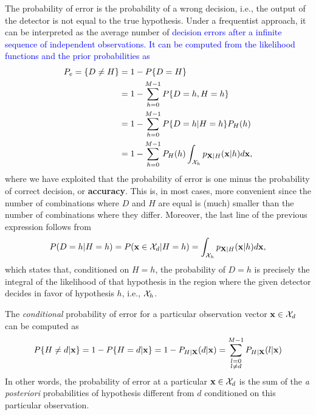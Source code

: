 The probability of error is the probability of a wrong decision, i.e., the output of the detector is not equal to the true hypothesis. Under a frequentist approach, it can be interpreted as the average number of \textcolor{blue}{decision errors after a infinite sequence of independent observations. It can be computed from the likelihood functions and the prior probabilities as}
\begin{align}
    P_e = \{D\neq H\} & = 1 - P\{D=H\} \nonumber \\
    & = 1 - \sum_{h=0}^{M-1} P\{D=h, H=h\} \nonumber \\
    & = 1 - \sum_{h=0}^{M-1} P\{D=h| H=h\} P_H(h) \nonumber \\
    & = 1 - \sum_{h=0}^{M-1} P_H(h) \int_{{\cal X}_h} p_{{\bf X}|H}({\bf x}|h) d{\bf x},\nonumber
\end{align}
where we have exploited that the probability of error is one minus the probability of correct decision, or \textbf{accuracy}. This is, in most cases, more convenient since the number of combinations where $D$ and $H$ are equal is (much) smaller than the number of combinations where they differ. Moreover, the last line of the previous expression follows from
$$P(D=h| H=h) = P({\bf x}\in {\cal X}_d| H=h) = \int_{{\cal X}_h} p_{{\bf X}|H}({\bf x}|h) d{\bf x},$$
which states that, conditioned on $H=h$, the probability of $D=h$ is precisely the integral of the likelihood of that hypothesis in the region where the given detector decides in favor of hypothesis $h$, i.e., ${\cal X}_h$.

The \emph{conditional} probability of error for a particular observation vector ${\bf x} \in {\cal X}_d$ can be computed as
\begin{equation}
P\{H\neq d|{\bf x}\} = 1 - P\{H = d|{\bf x}\} = 1 - P_{H|{\bf X}}(d|{\bf x}) 
                     = \sum_{\substack{l = 0 \\ l \neq d}}^{M-1} P_{H|{\bf X}}(l|{\bf x})
\label{eq:Pe_x}
\end{equation}
In other words, the probability of error at a particular ${\bf x} \in {\cal X}_d$ is the sum of the {\em a posteriori} probabilities of hypothesis different from $d$ conditioned on this particular observation. 

